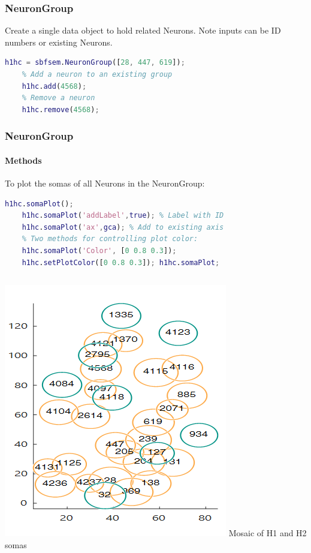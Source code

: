 \documentclass[11pt]{beamer}
\begin{document}
\begin{frame}[fragile]
	\frametitle{NeuronGroup}
	Create a single data object to hold related Neurons. Note inputs can be ID numbers or existing Neurons.
	\begin{lstlisting}[language=matlab]
	h1hc = sbfsem.NeuronGroup([28, 447, 619]);
	% Add a neuron to an existing group
	h1hc.add(4568);
	% Remove a neuron
	h1hc.remove(4568);\end{lstlisting}
\end{frame}
\begin{frame}[fragile]
	\frametitle{NeuronGroup}
	\framesubtitle{Methods}
	To plot the somas of all Neurons in the NeuronGroup:
	\begin{lstlisting}[language=matlab]
	h1hc.somaPlot();
	h1hc.somaPlot('addLabel',true); % Label with ID
	h1hc.somaPlot('ax',gca); % Add to existing axis
	% Two methods for controlling plot color:
	h1hc.somaPlot('Color', [0 0.8 0.3]);
	h1hc.setPlotColor([0 0.8 0.3]); h1hc.somaPlot;\end{lstlisting}
	\begin{columns}
			\includegraphics[height=0.4\textheight]{h1h2mosaic}
			Mosaic of H1 and H2 somas
	\end{columns}
\end{frame}
\end{document}
